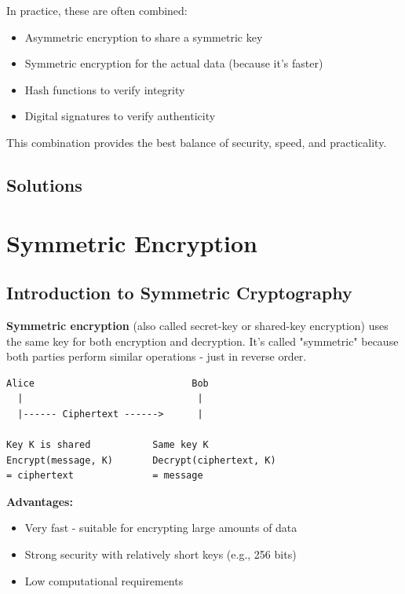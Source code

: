\documentclass[11pt,a4paper]{report}
\begin{document}
In practice, these are often combined:
\begin{itemize}
\item Asymmetric encryption to share a symmetric key
\item Symmetric encryption for the actual data (because it's faster)
\item Hash functions to verify integrity
\item Digital signatures to verify authenticity
\end{itemize}

This combination provides the best balance of security, speed, and practicality.

\newpage
\section{Solutions}
\printcursols
\newpage
\chapter{Symmetric Encryption}

\section{Introduction to Symmetric Cryptography}

\textbf{Symmetric encryption} (also called secret-key or shared-key encryption) uses the same key for both encryption and decryption. It's called "symmetric" because both parties perform similar operations - just in reverse order.

\begin{center}
\begin{verbatim}
Alice                            Bob
  |                               |
  |------ Ciphertext ------>      |

Key K is shared           Same key K
Encrypt(message, K)       Decrypt(ciphertext, K)
= ciphertext              = message
\end{verbatim}
\end{center}

\textbf{Advantages:}
\begin{itemize}
\item Very fast - suitable for encrypting large amounts of data
\item Strong security with relatively short keys (e.g., 256 bits)
\item Low computational requirements
\end{itemize}
\end{document}
